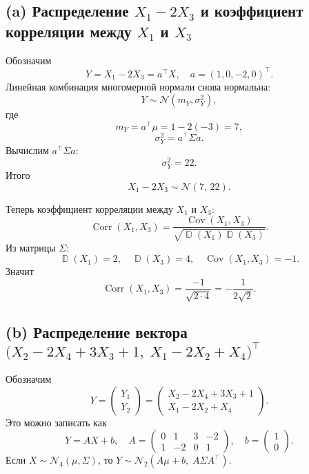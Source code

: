 \documentclass[12pt]{article}
\DeclareMathOperator{\Var}{\mathbb{D}}
\DeclareMathOperator{\Cov}{Cov}
\DeclareMathOperator{\Corr}{Corr}
\begin{document}
    \subsection*{(a) Распределение $X_1 - 2X_3$ и коэффициент корреляции между $X_1$ и $X_3$}

    Обозначим
    \[
        Y = X_1 - 2X_3 = a^\top X,\quad
        a = (1,0,-2,0)^\top.
    \]
    Линейная комбинация многомерной нормали снова нормальна:
    \[
        Y \sim \mathcal{N}(m_Y,\sigma_Y^2),
    \]
    где
    \[
        m_Y = a^\top \mu
        = 1 - 2(-3)
        = 7,
    \]
    \[
        \sigma_Y^2 = a^\top \Sigma a.
    \]
    Вычислим $a^\top \Sigma a$:
    \[
        \sigma_Y^2 = 22.
    \]
    Итого
    \[
        X_1 - 2X_3 \sim \mathcal{N}(7,\,22).
    \]

    Теперь коэффициент корреляции между $X_1$ и $X_3$:
    \[
        \Corr(X_1,X_3)
        = \frac{\Cov(X_1,X_3)}{\sqrt{\Var(X_1)\Var(X_3)}}.
    \]
    Из матрицы $\Sigma$:
    \[
        \Var(X_1)=2,\quad
        \Var(X_3)=4,\quad
        \Cov(X_1,X_3)=-1.
    \]
    Значит
    \[
        \Corr(X_1,X_3)
        = \frac{-1}{\sqrt{2\cdot 4}}
        = -\frac{1}{2\sqrt{2}}.
    \]

    \subsection*{(b) Распределение вектора
        $\bigl(X_2 - 2X_4 + 3X_3 + 1,\; X_1 - 2X_2 + X_4\bigr)^\top$}

    Обозначим
    \[
        Y =
        \begin{pmatrix}
            Y_1\\ Y_2
        \end{pmatrix}
        =
        \begin{pmatrix}
            X_2 - 2X_4 + 3X_3 + 1\\[4pt]
            X_1 - 2X_2 + X_4
        \end{pmatrix}.
    \]
    Это можно записать как
    \[
        Y = A X + b,
        \quad
        A =
        \begin{pmatrix}
            0 & 1 & 3 & -2\\
            1 & -2 & 0 & 1
        \end{pmatrix},
        \quad
        b=
        \begin{pmatrix}
            1\\[2pt]
            0
        \end{pmatrix}.
    \]
    Если $X \sim \mathcal{N}_4(\mu,\Sigma)$, то $Y \sim \mathcal{N}_2(A\mu+b,\; A\Sigma A^\top)$.
\end{document}

